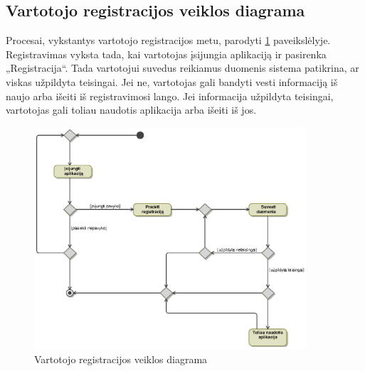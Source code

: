 \documentclass[12pt]{article}
\begin{document}
	\subsection{Vartotojo registracijos veiklos diagrama}
	Procesai, vykstantys vartotojo registracijos metu, parodyti \ref{RegisterActivity} paveikslėlyje. Registravimas vyksta tada, kai vartotojas įsijungia aplikaciją ir pasirenka „Registracija“. Tada vartotojui suvedus reikiamus duomenis sistema patikrina, ar viskas užpildyta teisingai. Jei ne, vartotojas gali bandyti vesti informaciją iš naujo arba išeiti iš registravimosi lango. Jei informacija užpildyta teisingai, vartotojas gali toliau naudotis aplikacija arba išeiti iš jos.
	\begin{figure}[h]
		\begin{center}
			\includegraphics[width=0.9\textwidth]{RegistracijosVeikla.eps}
			\caption{Vartotojo registracijos veiklos diagrama\label{RegisterActivity}}
		\end{center}
	\end{figure}
	
	\pagebreak
	
\end{document}
